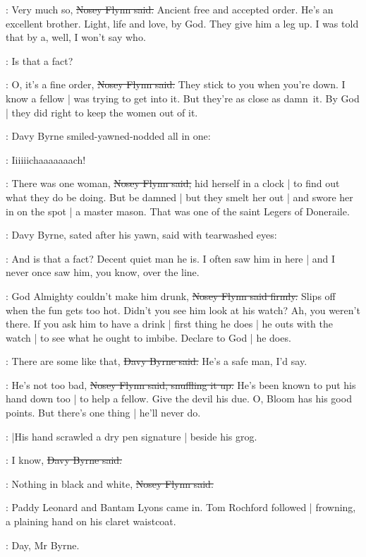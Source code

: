 \nosey:
Very much so,
\sout{Nosey Flynn said.}
Ancient free and accepted order.
He's an excellent brother.
Light, life and love, by God.
They give him a leg up.
I was told that by a,
well,
I won't say who.

\davybyrne:
Is that a fact?

\nosey:
O, it's a fine order,
\sout{Nosey Flynn said.}
They stick to you when you're down.
I know a fellow |
was trying to get into it.
But they're as close as damn~it.
By God |
they did right to keep the women out of it.

:
Davy Byrne smiled-yawned-nodded all in one:

\davybyrne:
Iiiiiichaaaaaaach!

\nosey:
There was one woman,
\sout{Nosey Flynn said,}
hid herself in a clock |
to find out what they do be doing.
But be damned |
but they smelt her out |
and swore her in on the spot |
a master mason.
That was one of the saint Legers of Doneraile.

:
Davy Byrne,
sated after his yawn,
said with tearwashed eyes:

\davybyrne:
And is that a fact?
Decent quiet man he is.
I often saw him in here |
and I never once saw him,
you know,
over the line.

\nosey:
God Almighty couldn't make him drunk,
\sout{Nosey Flynn said firmly.}
Slips off when the fun gets too hot.
Didn't you see him look at his watch?
Ah, you weren't there.
If you ask him to have a drink |
first thing he does |
he outs with the watch |
to see what he ought to imbibe.
Declare to God |
he does.

\davybyrne:
There are some like that,
\sout{Davy Byrne said.}
He's a safe man,
I'd say.

\nosey:
He's not too bad,
\sout{Nosey Flynn said, snuffling it up.}
He's been known to put his hand down too |
to help a fellow.
Give the devil his due.
O, Bloom has his good points.
But there's one thing |
he'll never do.

:
|His hand scrawled a dry pen signature |
beside his grog.

\davybyrne:
I know,
\sout{Davy Byrne said.}

\nosey:
Nothing in black and white,
\sout{Nosey Flynn said.}

:
Paddy Leonard and Bantam Lyons came in.
Tom Rochford followed |
frowning,
a plaining hand on his claret waistcoat.

\bantam:
Day, Mr Byrne.


